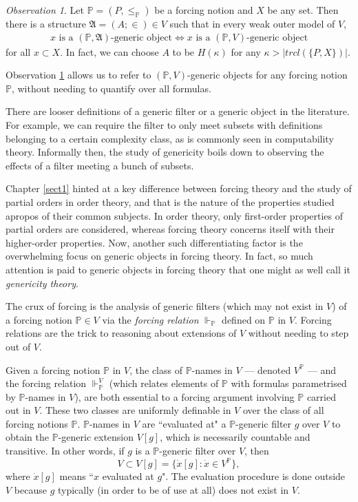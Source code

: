 \documentclass[12pt, twoside]{memoir}
\numberwithin{equation}{section}
\theoremstyle{definition}
\theoremstyle{remark}
\newtheorem{ob}[thm]{Observation}
\theoremstyle{definition}
\theoremstyle{definition}
\theoremstyle{definition}
\theoremstyle{remark}
\begin{document}
\begin{ob}\label{ob0}
Let $\mathbb{P} = (P, \leq_{\mathbb{P}})$ be a forcing notion and $X$ be any set. Then there is a structure $\mathfrak{A} = (A; \in) \in V$ such that in every weak outer model of $V$, 
\begin{align*}
    x \text{ is a } (\mathbb{P}, \mathfrak{A}) \text{-generic object} \iff x \text{ is a } (\mathbb{P}, V) \text{-generic object}
\end{align*}
for all $x \subset X$. In fact, we can choose $A$ to be $H(\kappa)$ for any $\kappa > |trcl(\{P, X\})|$.
\end{ob}

Observation \ref{ob0} allows us to refer to $(\mathbb{P}, V)$-generic objects for any forcing notion $\mathbb{P}$, without needing to quantify over all formulas.

There are looser definitions of a generic filter or a generic object in the literature. For example, we can require the filter to only meet subsets with definitions belonging to a certain complexity class, as is commonly seen in computability theory. Informally then, the study of genericity boils down to observing the effects of a filter meeting a bunch of subsets. 

Chapter \ref{sect1} hinted at a key difference between forcing theory and the study of partial orders in order theory, and that is the nature of the properties studied apropos of their common subjects. In order theory, only first-order properties of partial orders are considered, whereas forcing theory concerns itself with their higher-order properties. Now, another such differentiating factor is the overwhelming focus on generic objects in forcing theory. In fact, so much attention is paid to generic objects in forcing theory that one might as well call it \emph{genericity theory}.

The crux of forcing is the analysis of generic filters (which may not exist in $V$) of a forcing notion $\mathbb{P} \in V$ via the \emph{forcing relation} $\Vdash_{\mathbb{P}}$ defined on $\mathbb{P}$ in $V$. Forcing relations are the trick to reasoning about extensions of $V$ without needing to step out of $V$.

Given a forcing notion $\mathbb{P}$ in $V$, the class of $\mathbb{P}$-names in $V$ --- denoted $V^{\mathbb{P}}$ --- and the forcing relation $\Vdash_{\mathbb{P}}^V$ (which relates elements of $\mathbb{P}$ with formulas parametrised by $\mathbb{P}$-names in $V$), are both essential to a forcing argument involving $\mathbb{P}$ carried out in $V$. These two classes are uniformly definable in $V$ over the class of all forcing notions $\mathbb{P}$. $\mathbb{P}$-names in $V$ are ``evaluated at" a $\mathbb{P}$-generic filter $g$ over $V$ to obtain the $\mathbb{P}$-generic extension $V[g]$, which is necessarily countable and transitive. In other words, if $g$ is a $\mathbb{P}$-generic filter over $V$, then
\begin{equation*}
    V \subset V[g] = \{\dot{x}[g] : \dot{x} \in V^{\mathbb{P}}\},
\end{equation*}
where $\dot{x}[g]$ means ``$x$ evaluated at $g$". The evaluation procedure is done outside $V$ because $g$ typically (in order to be of use at all) does not exist in $V$. 
\end{document}
